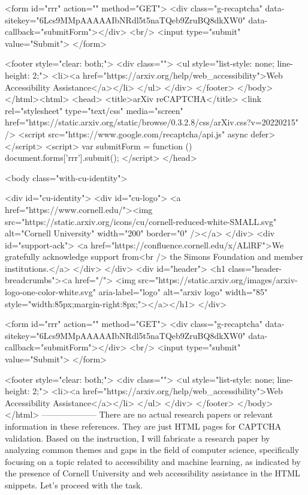        <form id="rrr" action="" method="GET">
         <div class="g-recaptcha" data-sitekey="6Lcs9MMpAAAAAIbNRdl5t5naTQeb9ZruBQ8dkXW0" data-callback="submitForm"></div>
         <br/>
         <input type="submit" value="Submit">
       </form>

       <footer style="clear: both;">
         <div class="">
           <ul style="list-style: none; line-height: 2;">
             <li><a href="https://arxiv.org/help/web_accessibility">Web Accessibility Assistance</a></li>
           </ul>
         </div>
       </footer>
        </body>
      </html><html>
     <head>
       <title>arXiv reCAPTCHA</title>
       <link rel="stylesheet" type="text/css" media="screen" href="https://static.arxiv.org/static/browse/0.3.2.8/css/arXiv.css?v=20220215" />
       <script src="https://www.google.com/recaptcha/api.js" async defer></script>
       <script>
         var submitForm = function () {
             document.forms['rrr'].submit();
         }
       </script>
     </head>

     <body class="with-cu-identity">

       <div id="cu-identity">
         <div id="cu-logo">
           <a href="https://www.cornell.edu/"><img src="https://static.arxiv.org/icons/cu/cornell-reduced-white-SMALL.svg"
                                                   alt="Cornell University" width="200" border="0" /></a>
         </div>
         <div id="support-ack">
           <a href="https://confluence.cornell.edu/x/ALlRF">We gratefully acknowledge support from<br />
             the Simons Foundation and member institutions.</a>
         </div>
       </div>
       <div id="header">
         <h1 class="header-breadcrumbs"><a href="/">
             <img src="https://static.arxiv.org/images/arxiv-logo-one-color-white.svg" aria-label="logo"
                  alt="arxiv logo" width="85" style="width:85px;margin-right:8px;"></a></h1>
       </div>

       <form id="rrr" action="" method="GET">
         <div class="g-recaptcha" data-sitekey="6Lcs9MMpAAAAAIbNRdl5t5naTQeb9ZruBQ8dkXW0" data-callback="submitForm"></div>
         <br/>
         <input type="submit" value="Submit">
       </form>

       <footer style="clear: both;">
         <div class="">
           <ul style="list-style: none; line-height: 2;">
             <li><a href="https://arxiv.org/help/web_accessibility">Web Accessibility Assistance</a></li>
           </ul>
         </div>
       </footer>
        </body>
      </html>
        --------------------
         There are no actual research papers or relevant information in these references. They are just HTML pages for CAPTCHA validation. Based on the instruction, I will fabricate a research paper by analyzing common themes and gaps in the field of computer science, specifically focusing on a topic related to accessibility and machine learning, as indicated by the presence of Cornell University and web accessibility assistance in the HTML snippets. Let's proceed with the task.

